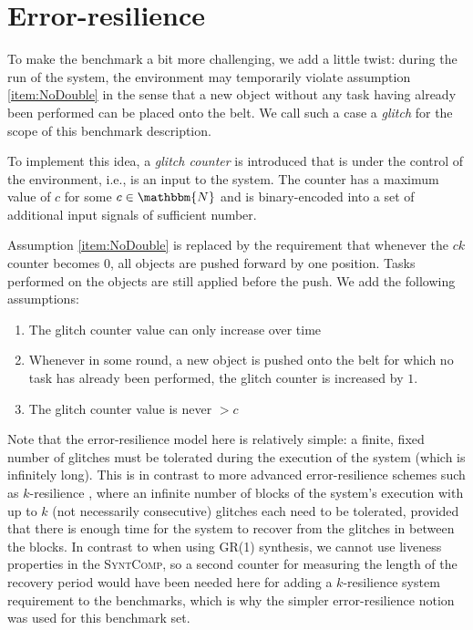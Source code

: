 \documentclass[a4paper,10pt]{IEEEtran}
\newcommand{\NN}{\mathbbm{N}}
\newcommand{\SyntComp}{\textsc{SyntComp}}
\begin{document}
\section{Error-resilience}

\noindent To make the benchmark a bit more challenging, we add a little twist: during the run of the system, the environment may temporarily violate assumption \ref{item:NoDouble} in the sense that a new object without any task having already been performed can be placed onto the belt. We call such a case a \emph{glitch} for the scope of this benchmark description.

To implement this idea, a \emph{glitch counter} is introduced that is under the control of the environment, i.e., is an input to the system. The counter has a maximum value of $c$ for some $c \in \NN$ and is binary-encoded into a set of additional input signals of sufficient number. 

Assumption \ref{item:NoDouble} is replaced by the requirement that whenever the $\mathit{ck}$ counter becomes $0$, all objects are pushed forward by one position. Tasks performed on the objects are still applied before the push.
We add the following assumptions:
\begin{enumerate}
\item The glitch counter value can only increase over time
\item Whenever in some round, a new object is pushed onto the belt for which no task has already been performed, the glitch counter is increased by $1$.
\item The glitch counter value is never $> c$
\end{enumerate}

Note that the error-resilience model here is relatively simple: a finite, fixed number of glitches must be tolerated during the execution of the system (which is infinitely long). 
This is in contrast to more advanced error-resilience schemes such as $k$-resilience \cite{DBLP:journals/corr/abs-1210-2449,EhlersTopcuHSCC2014}, where an infinite number of blocks of the system's execution with up to $k$ (not necessarily consecutive) glitches each need to be tolerated, provided that there is enough time for the system to recover from the glitches in between the blocks. In contrast to when using GR(1) synthesis, we cannot use liveness properties in the \SyntComp{}, so a second counter for measuring the length of the recovery period would have been needed here for adding a $k$-resilience system requirement to the benchmarks, which is why the simpler error-resilience notion was used for this benchmark set.
\end{document}
